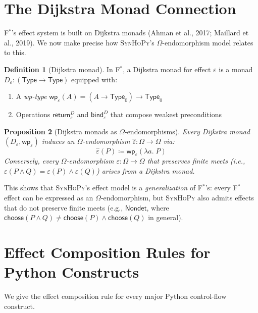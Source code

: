\documentclass[11pt,a4paper]{report}
\theoremstyle{definition}
\newtheorem{definition}{Definition}[chapter]
\theoremstyle{plain}
\newtheorem{proposition}[definition]{Proposition}
\newcommand{\Type}{\mathsf{Type}}
\newcommand{\defeq}{\coloneqq}
\newcommand{\Nondet}{\mathsf{Nondet}}
\newcommand{\fstar}{F$^{*}$}
\newcommand{\synhopy}{\textsc{SynHoPy}}
\begin{document}
\section{The Dijkstra Monad Connection}

\fstar{}'s effect system is built on Dijkstra monads (Ahman et al., 2017;
Maillard et al., 2019).  We now make precise how \synhopy{}'s
$\Omega$-endomorphism model relates to this.

\begin{definition}[Dijkstra monad]
In \fstar{}, a Dijkstra monad for effect $\varepsilon$ is a monad
$D_\varepsilon : (\Type \to \Type)$ equipped with:
\begin{enumerate}
  \item A \emph{wp-type} $\mathsf{wp}_\varepsilon(A) = (A \to \Type_0) \to \Type_0$
  \item Operations $\mathsf{return}^D_\varepsilon$ and $\mathsf{bind}^D_\varepsilon$
    that compose weakest preconditions
\end{enumerate}
\end{definition}

\begin{proposition}[Dijkstra monads as $\Omega$-endomorphisms]
\label{prop:dijkstra-omega}
Every Dijkstra monad $(D_\varepsilon, \mathsf{wp}_\varepsilon)$ induces an
$\Omega$-endomorphism $\hat{\varepsilon} : \Omega \to \Omega$ via:
\[
  \hat{\varepsilon}(P) \defeq \mathsf{wp}_\varepsilon(\lambda a.\; P)
\]
Conversely, every $\Omega$-endomorphism $\varepsilon : \Omega \to \Omega$
that preserves finite meets (i.e., $\varepsilon(P \land Q) = \varepsilon(P) \land \varepsilon(Q)$)
arises from a Dijkstra monad.
\end{proposition}

This shows that \synhopy{}'s effect model is a \emph{generalization} of
\fstar{}'s: every \fstar{} effect can be expressed as an
$\Omega$-endomorphism, but \synhopy{} also admits effects that do not
preserve finite meets (e.g., $\Nondet$, where
$\mathsf{choose}(P \land Q) \neq \mathsf{choose}(P) \land \mathsf{choose}(Q)$
in general).


\section{Effect Composition Rules for Python Constructs}

We give the effect composition rule for every major Python control-flow
construct.
\end{document}

